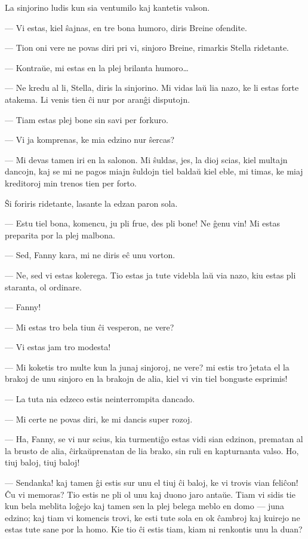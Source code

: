   La sinjorino ludis kun sia ventumilo kaj kantetis valson.

 --- Vi estas, kiel \^sajnas, en tre bona humoro, diris Breine ofendite.

 --- Tion oni vere ne povas diri pri vi, sinjoro Breine, rimarkis
Stella ridetante.

 --- Kontra\u ue, mi estas en la plej brilanta humoro\dots

 --- Ne kredu al li, Stella, diris la sinjorino. Mi vidas la\u u lia
nazo, ke li estas forte atakema. Li venis tien \^ci nur por aran\^gi
disputojn.

 --- Tiam estas plej bone sin savi per forkuro.

 --- Vi ja komprenas, ke mia edzino nur \^sercas?

 --- Mi devas tamen iri en la salonon. Mi \^suldas, jes, la dioj scias,
kiel multajn dancojn, kaj se mi ne pagos miajn \^suldojn tiel
balda\u u kiel eble, mi timas, ke miaj kreditoroj min trenos tien
per forto.

   \^Si foriris ridetante, lasante la edzan paron sola.

 --- Estu tiel bona, komencu, ju pli frue, des pli bone! Ne \^genu vin!
Mi estas preparita por la plej malbona.

 --- Sed, Fanny kara, mi ne diris e\^c unu vorton.

 --- Ne, sed vi estas kolerega. Tio estas ja tute videbla la\u u via
nazo, kiu estas pli staranta, ol ordinare.

 --- Fanny!

 --- Mi estas tro bela tiun \^ci vesperon, ne vere?

 --- Vi estas jam tro modesta!

 --- Mi koketis tro multe kun la junaj sinjoroj, ne vere? mi estis tro
\^{\j}etata el la brakoj de unu sinjoro en la brakojn de alia, kiel
vi vin tiel bonguste esprimis!

 --- La tuta nia edzeco estis neinterrompita dancado.

 --- Mi certe ne povas diri, ke mi dancis super rozoj.

 --- Ha, Fanny, se vi nur scius, kia turmenti\^go estas vidi sian
edzinon, prematan al la brusto de alia, \^cirka\u uprenatan de lia
brako, sin ruli en kapturnanta valso. Ho, tiuj baloj, tiuj baloj!

 --- Sendanka! kaj tamen \^gi estis sur unu el tiuj \^ci baloj, ke vi
trovis vian feli\^con! \^Cu vi memoras? Tio estis ne pli ol unu kaj
duono jaro anta\u ue. Tiam vi sidis tie kun bela meblita lo\^gejo
kaj tamen sen la plej belega meblo en domo --- juna edzino; kaj tiam
vi komencis trovi, ke esti tute sola en ok \^cambroj kaj kuirejo ne
estas tute sane por la homo. Kie tio \^ci estis tiam, kiam ni
renkontis unu la duan?

